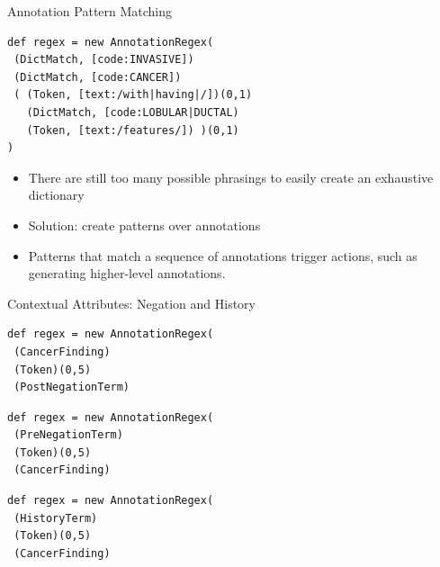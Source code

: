 \documentclass[10pt]{beamer}
\begin{document}
\begin{frame}[fragile]{Annotation Pattern Matching}

\begin{lstlisting}[frame=single]
def regex = new AnnotationRegex(
 (DictMatch, [code:INVASIVE])
 (DictMatch, [code:CANCER])
 ( (Token, [text:/with|having|/])(0,1)
   (DictMatch, [code:LOBULAR|DUCTAL)
   (Token, [text:/features/]) )(0,1)
)
\end{lstlisting}

\begin{itemize}
	\item There are still too many possible phrasings to easily create an exhaustive dictionary
	\item Solution: create \alert{patterns} over annotations
	\item Patterns that match a sequence of annotations trigger \alert{actions}, such as generating higher-level annotations.
\end{itemize}

\end{frame}

\begin{frame}[fragile]{Contextual Attributes: Negation and History}
\begin{lstlisting}[frame=single]
def regex = new AnnotationRegex(
 (CancerFinding)
 (Token)(0,5)
 (PostNegationTerm)
\end{lstlisting}

\begin{lstlisting}[frame=single]
def regex = new AnnotationRegex(
 (PreNegationTerm)
 (Token)(0,5)
 (CancerFinding)
\end{lstlisting}

\begin{lstlisting}[frame=single]
def regex = new AnnotationRegex(
 (HistoryTerm)
 (Token)(0,5)
 (CancerFinding)
\end{lstlisting}

\end{frame}
\end{document}
